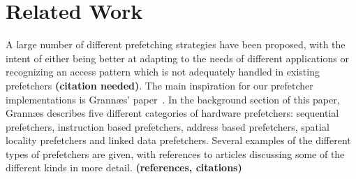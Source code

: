 
\section{Related Work}
\label{sec:relatedWork}

A large number of different prefetching strategies have been proposed,
with the intent of either being better at adapting to the needs of
different applications or recognizing an access pattern which is not
adequately handled in existing prefetchers \textbf{(citation
  needed)}. The main inspiration for our prefetcher implementations is
Grannæs' paper~\cite{Grannæs}. In the background section of this
paper, Grannæs describes five different categories of hardware
prefetchers: sequential prefetchers, instruction based prefetchers,
address based prefetchers, spatial locality prefetchers and linked
data prefetchers. Several examples of the different types of
prefetchers are given, with references to articles discussing some of
the different kinds in more detail.  {\bf (references, citations)}
